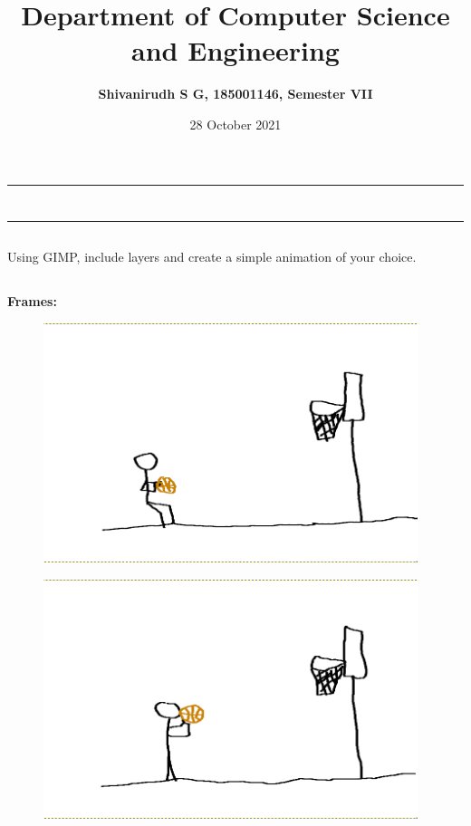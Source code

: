\documentclass[9pt,letterpaper]{article}
\title{\textbf{Department of Computer Science and Engineering}}
\author{\textbf{Shivanirudh S G, 185001146, Semester VII }}
\date{28 October 2021}
\begin{document}
\maketitle
\hrule
\section*{}
\hrule 
\bigskip\bigskip

\subsection*{}

\subsection*{}
\begin{flushleft}
    Using GIMP, include layers and create a simple animation of your choice.
\end{flushleft}

\subsection*{}

\textbf{Frames:}\\
\begin{figure}[h]
    \centering
    \includegraphics[height=7cm]{Outputs/Frame1.png}
\end{figure}

\newpage
\begin{figure}[h]
    \centering
    \includegraphics[height=7cm]{Outputs/Frame2.png}
\end{figure}
\end{document}
